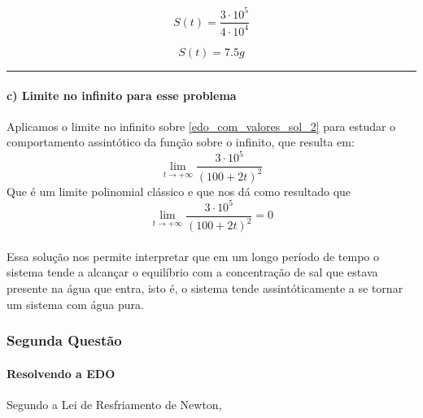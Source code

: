 \documentclass[11pt]{article}
\begin{document}
\begin{equation*}
    \label{edo_com_valores_sol_4}
    S(t) = \frac{3 \cdot 10^{5}}{4\cdot 10^{4}}
\end{equation*}

\begin{equation*}
    \label{edo_com_valores_sol_5}
    S(t) = 7.5 g
\end{equation*}

    \begin{center}\rule{0.5\linewidth}{\linethickness}\end{center}

\hypertarget{c-limite-no-infinito-para-esse-problema}{%
\paragraph{c) Limite no infinito para esse
problema}\label{c-limite-no-infinito-para-esse-problema}}

Aplicamos o limite no infinito sobre \eqref{edo_com_valores_sol_2} para
estudar o comportamento assintótico da função sobre o infinito, que
resulta em: \begin{equation*}
    \displaystyle{\lim_{t \to +\infty}} \frac{3 \cdot 10^{5}}{(100 + 2t)^{2}}
\end{equation*} Que é um limite polinomial clássico e que nos dá como
resultado que \begin{equation*}
    \displaystyle{\lim_{t \to +\infty}} \frac{3 \cdot 10^{5}}{(100 + 2t)^{2}} = 0
\end{equation*}\\
Essa solução nos permite interpretar que em um longo período de tempo o
sistema tende a alcançar o equilíbrio com a concentração de sal que
estava presente na água que entra, isto é, o sistema tende
assintóticamente a se tornar um sistema com água pura.

    \hypertarget{segunda-questuxe3o}{%
\subsubsection{Segunda Questão}\label{segunda-questuxe3o}}

\hypertarget{resolvendo-a-edo}{%
\paragraph{Resolvendo a EDO}\label{resolvendo-a-edo}}

Segundo a Lei de Resfriamento de Newton,
\end{document}
